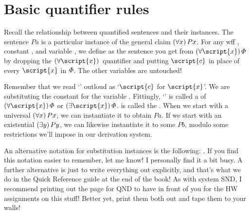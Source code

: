 \section{Basic quantifier rules}


Recall the relationship between quantified sentences and their instances. The sentence $Pa$ is a particular instance of the general claim $(\forall x) \, Px$. For any wff \metaA{}, constant , and variable , we define  \metaA{} as the sentence you get from $\qt{\forall}{\script{x}}\metaA{}$ by dropping the $\qt{\forall}{\script{x}}$ quantifier and putting $\script{c}$ in place of every $\script{x}$ in $\varPhi{}$. The other variables are untouched! 

Remember that we read `' outloud as `$\script{c}$ for $\script{x}$'. We are substituting the constant  for the variable . Fittingly, `\metaA{}' is called a  of $\qt{\forall}{\script{x}}\metaA{}$ or $\qt{\exists}{\script{x}}\metaA{}$.  is called the . When we start with a universal $(\forall x) \, Px$, we can instantiate it to obtain $Pa$. If we start with an existential $(\exists y) \,Py$, we can likewise instantiate it to some $Pb$, modulo some restrictions we'll impose in our derivation system. 

{\color{black}An alternative notation for substitution instances is the following: \metaA{}\hspace{.15em}. If you find this notation easier to remember, let me know! I personally find it a bit busy. A further alternative is just to write everything out explicitly, and that's what we do in the Quick Reference guide at the end of the book! As with system SND, I recommend printing out the page for QND to have in front of you for the HW assignments on this stuff! Better yet, print them both out and tape them to your walls!} 











